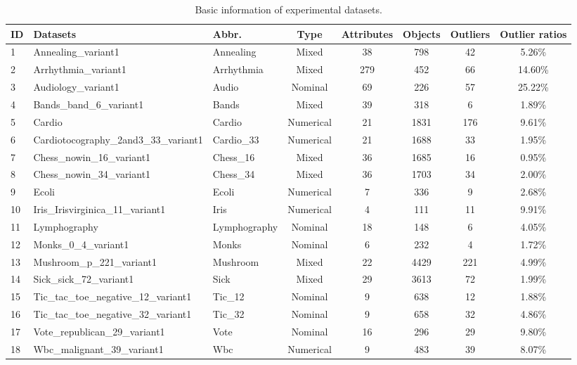 \documentclass[ASNA,twocolumn]{USG} %
\begin{document}
\begin{table}[!ht]
	\caption{Basic information of experimental datasets.}\label{KSRA-DS}
    \centering
		\begin{tabular}{lllccccc}
			\toprule
			ID & Datasets & Abbr. & Type & Attributes & Objects & Outliers & Outlier ratios \\\midrule
            1 & Annealing\_variant1 & Annealing & Mixed & 38 & 798 & 42 & 5.26\% \\
            2 & Arrhythmia\_variant1 & Arrhythmia & Mixed & 279 & 452 & 66 & 14.60\% \\
            3 & Audiology\_variant1 & Audio & Nominal & 69 & 226 & 57 & 25.22\% \\
            4 & Bands\_band\_6\_variant1 & Bands & Mixed & 39 & 318 & 6 & 1.89\% \\
            5 & Cardio & Cardio & Numerical & 21 & 1831 & 176 & 9.61\% \\
            6 & Cardiotocography\_2and3\_33\_variant1 & Cardio\_33 & Numerical & 21 & 1688 & 33 & 1.95\% \\
            7 & Chess\_nowin\_16\_variant1 & Chess\_16 & Mixed & 36 & 1685 & 16 & 0.95\% \\
            8 & Chess\_nowin\_34\_variant1 & Chess\_34 & Mixed & 36 & 1703 & 34 & 2.00\% \\
            9 & Ecoli & Ecoli & Numerical & 7 & 336 & 9 & 2.68\% \\
            10 & Iris\_Irisvirginica\_11\_variant1 & Iris & Numerical & 4 & 111 & 11 & 9.91\% \\
            11 & Lymphography & Lymphography & Nominal & 18 & 148 & 6 & 4.05\% \\
            12 & Monks\_0\_4\_variant1 & Monks & Nominal & 6 & 232 & 4 & 1.72\% \\
            13 & Mushroom\_p\_221\_variant1 & Mushroom & Mixed & 22 & 4429 & 221 & 4.99\% \\
            14 & Sick\_sick\_72\_variant1 & Sick & Mixed & 29 & 3613 & 72 & 1.99\% \\
            15 & Tic\_tac\_toe\_negative\_12\_variant1 & Tic\_12 & Nominal & 9 & 638 & 12 & 1.88\% \\
            16 & Tic\_tac\_toe\_negative\_32\_variant1 & Tic\_32 & Nominal & 9 & 658 & 32 & 4.86\% \\
            17 & Vote\_republican\_29\_variant1 & Vote & Nominal & 16 & 296 & 29 & 9.80\% \\
            18 & Wbc\_malignant\_39\_variant1 & Wbc & Numerical & 9 & 483 & 39 & 8.07\% \\

\end{tabular}
\end{table}
\end{document}
